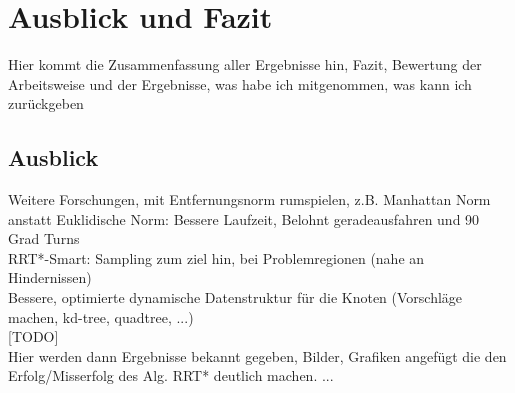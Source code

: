 \section{Ausblick und Fazit}
\label{sec:Zusammenfassung}
Hier kommt die Zusammenfassung aller Ergebnisse hin, Fazit, Bewertung der Arbeitsweise und der Ergebnisse, was habe ich mitgenommen, was kann ich zurückgeben

\subsection{Ausblick}
Weitere Forschungen, mit Entfernungsnorm rumspielen, z.B. Manhattan Norm anstatt Euklidische Norm: Bessere Laufzeit, Belohnt geradeausfahren und 90 Grad Turns \\
RRT*-Smart: Sampling zum ziel hin, bei Problemregionen (nahe an Hindernissen) \\
Bessere, optimierte dynamische Datenstruktur für die Knoten (Vorschläge machen, kd-tree, quadtree, ...)\\


[TODO] \\
Hier werden dann Ergebnisse bekannt gegeben, Bilder, Grafiken angefügt die den Erfolg/Misserfolg des Alg. RRT* deutlich machen.
...